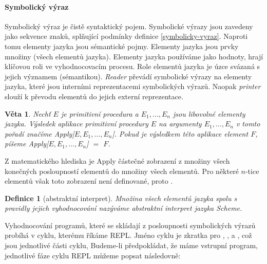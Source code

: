 \documentclass[10pt,a4paper]{article}
\newtheorem{veta}{Věta}
\newtheorem{definition}{Definice}
\begin{document}
    \paragraph{Symbolický výraz} Symbolický výraz je čistě syntaktický pojem. Symbolické výrazy jsou zavedeny jako sekvence znaků, splňující podmínky definice \ref{symbolicky-vyraz}. Naproti tomu elementy jazyka jsou sémantické pojmy. Elementy jazyka jsou prvky množiny (všech elementů jazyka). Elementy jazyka používáme jako hodnoty, hrají klíčovou roli ve vyhodnocovacím procesu. Role elementů jazyka je úzce svázaná s jejich významem (sémantikou). \textit{Reader} převádí symbolické výrazy na elementy jazyka, které jsou interními reprezentacemi symbolických výrazů. Naopak \textit{printer} slouží k převodu elementů do jejich externí reprezentace.
    \begin{veta}
      Nechť $E$ je primitivní procedura a $E_{1},\ldots,E_{n}$ jsou libovolné elementy jazyka. Výsledek \textit{aplikace primitivní procedury $E$ na argumenty $E_{1},\ldots,E_{n}$ v tomto pořadí} značíme Apply[$E,E_{1},\ldots,E_{n}$]. Pokud je výsledkem této aplikace element $F$, píšeme Apply[$E,E_{1},\ldots,E_{n}$] $=$ $F$.
    \end{veta}
    Z matematického hlediska je Apply částečné zobrazení z množiny všech konečných posloupností elementů do množiny všech elementů. Pro některé $n$-tice elementů však toto zobrazení není definované, proto .
    \begin{definition}[abstraktní interpret]\label{def-abstraktni-interpret}
      Množina všech elementů jazyka spolu s pravidly jejich vyhodnocování nazýváme \textit{abstraktní interpret jazyka Scheme}.
    \end{definition}
    Vyhodnocování programů, které se skládají z posloupnosti symbolických výrazů probíhá v cyklu, kterému říkáme REPL. Jméno cyklu je zkratka pro , ,  a , což jsou jednotlivé části cyklu, Budeme-li předpokládat, že máme vstrupní program, jednotlivé fáze cyklu REPL můžeme popsat následovně:
    
\end{document}
